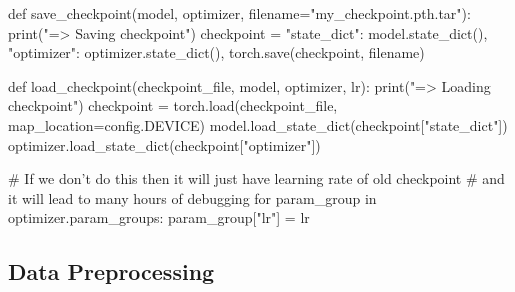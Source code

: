 def save_checkpoint(model, optimizer, filename="my_checkpoint.pth.tar"):
    print("=> Saving checkpoint")
    checkpoint = {
        "state_dict": model.state_dict(),
        "optimizer": optimizer.state_dict(),
    }
    torch.save(checkpoint, filename)


def load_checkpoint(checkpoint_file, model, optimizer, lr):
    print("=> Loading checkpoint")
    checkpoint = torch.load(checkpoint_file, map_location=config.DEVICE)
    model.load_state_dict(checkpoint["state_dict"])
    optimizer.load_state_dict(checkpoint["optimizer"])

    # If we don't do this then it will just have learning rate of old checkpoint
    # and it will lead to many hours of debugging \:
    for param_group in optimizer.param_groups:
        param_group["lr"] = lr
        




\subsection{Data Preprocessing}



